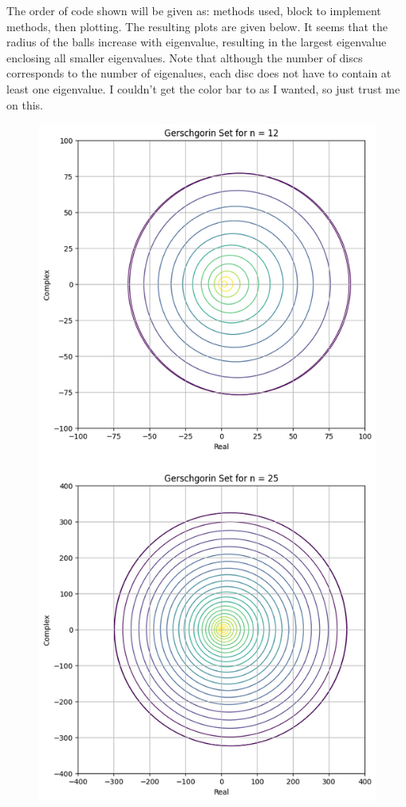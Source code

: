 \partbreak
\begin{solution}

    The order of code shown will be given as: methods used, block to implement methods, then plotting. The resulting plots are given below. It seems that the radius of the balls increase with eigenvalue, resulting in the largest eigenvalue enclosing all smaller eigenvalues. Note that although the number of discs corresponds to the number of eigenalues, each disc does not have to contain at least one eigenvalue. I couldn't get the color bar to  as I wanted, so just trust me on this.  

\vspace{\floatsep}
\clearpage

\jump
\begin{figure}[!h]
\centering
\includegraphics[scale = 0.6]{Images/gerschgorin balls.png}

\end{figure}
\end{solution}

